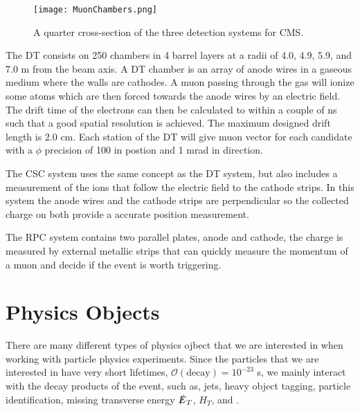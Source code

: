 \begin{figure}
 	\centering
	\texttt{[image: MuonChambers.png]}
 	\caption{A quarter cross-section of the three detection systems for CMS. }
 	\label{MuonChambers} 
\end{figure}

The DT consists on 250 chambers in 4 barrel layers at a radii of 4.0, 4.9, 5.9, and 7.0 m from the beam axis. A DT chamber is an array of anode wires in a gaseous medium where the walls are cathodes. A muon passing through the gas will ionize some atoms which are then forced towards the anode wires by an electric field. The drift time of the electrons can then be calculated to within a couple of ns such that a good spatial resolution is achieved. The maximum designed drift length is 2.0 cm. Each station of the DT will give muon vector for each candidate with a $\phi$ precision of 100 \mum in postion and 1 mrad in direction. 

The CSC system uses the same concept as the DT system, but also includes a measurement of the ions that follow the electric field to the cathode strips. In this system the anode wires and the cathode strips are perpendicular so the collected charge on both provide a accurate position measurement. 

The RPC system contains two parallel plates, anode and cathode, the charge is measured by external metallic strips that can quickly measure the momentum of a muon and decide if the event is worth triggering.

\section{Physics Objects}\label{PhysObj}
There are many different types of physics ojbect that we are interested in when working with particle physics experiments. Since the particles that we are interested in have very short lifetimes, $\mathcal{O}(\text{decay})=10^{-23}$ s, we mainly interact with the decay products of the event, such as, jets, heavy object tagging, particle identification, missing transverse energy $\slashed{E}_{T}$, $H_T$, and .

